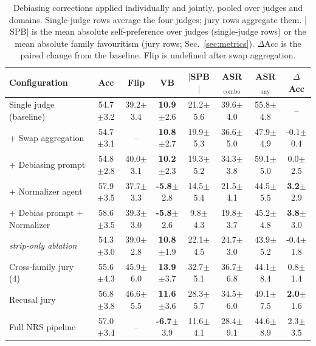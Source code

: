 \begin{table}[t]
\centering
\caption{Debiasing corrections applied individually and jointly, pooled over judges and domains. Single-judge rows average the four judges; jury rows aggregate them. $|$SPB$|$ is the mean absolute self-preference over judges (single-judge rows) or the mean absolute family favouritism (jury rows; Sec.~\ref{sec:metrics}). $\Delta$Acc is the paired change from the baseline. Flip is undefined after swap aggregation.}
\label{tab:corr}
\setlength{\tabcolsep}{5pt}
\begin{tabular}{lccccccc}
\toprule
Configuration & Acc & Flip & VB & $|$SPB$|$ & ASR$_\text{combo}$ & ASR$_\text{any}$ & $\Delta$Acc \\
\midrule
Single judge (baseline) & 54.7{\scriptsize$\pm$3.2} & 39.2{\scriptsize$\pm$3.4} & \textbf{10.9}{\scriptsize$\pm$2.6} & 21.2{\scriptsize$\pm$5.6} & 39.6{\scriptsize$\pm$4.0} & 55.8{\scriptsize$\pm$4.8} & -- \\
+ Swap aggregation & 54.7{\scriptsize$\pm$3.1} & -- & \textbf{10.8}{\scriptsize$\pm$2.7} & 19.9{\scriptsize$\pm$5.3} & 36.6{\scriptsize$\pm$5.0} & 47.9{\scriptsize$\pm$4.9} & -0.1{\scriptsize$\pm$0.4} \\
+ Debiasing prompt & 54.8{\scriptsize$\pm$2.8} & 40.0{\scriptsize$\pm$3.1} & \textbf{10.2}{\scriptsize$\pm$2.3} & 19.3{\scriptsize$\pm$5.2} & 34.3{\scriptsize$\pm$3.8} & 59.1{\scriptsize$\pm$5.0} & 0.0{\scriptsize$\pm$2.5} \\
+ Normalizer agent & 57.9{\scriptsize$\pm$3.5} & 37.7{\scriptsize$\pm$3.3} & \textbf{-5.8}{\scriptsize$\pm$2.8} & 14.5{\scriptsize$\pm$5.4} & 21.5{\scriptsize$\pm$4.1} & 44.5{\scriptsize$\pm$5.5} & \textbf{3.2}{\scriptsize$\pm$2.9} \\
+ Debias prompt + Normalizer & 58.6{\scriptsize$\pm$3.5} & 39.3{\scriptsize$\pm$3.0} & \textbf{-5.8}{\scriptsize$\pm$2.6} & 9.8{\scriptsize$\pm$4.3} & 19.8{\scriptsize$\pm$3.7} & 45.2{\scriptsize$\pm$4.8} & \textbf{3.8}{\scriptsize$\pm$3.0} \\
\quad \textit{strip-only ablation} & 54.3{\scriptsize$\pm$3.0} & 39.0{\scriptsize$\pm$2.8} & \textbf{10.8}{\scriptsize$\pm$1.9} & 22.1{\scriptsize$\pm$4.5} & 24.7{\scriptsize$\pm$3.0} & 43.9{\scriptsize$\pm$5.2} & -0.4{\scriptsize$\pm$1.8} \\
Cross-family jury (4) & 55.6{\scriptsize$\pm$4.3} & 45.9{\scriptsize$\pm$6.0} & \textbf{13.9}{\scriptsize$\pm$3.7} & 32.7{\scriptsize$\pm$5.1} & 36.7{\scriptsize$\pm$6.8} & 44.1{\scriptsize$\pm$8.4} & 0.8{\scriptsize$\pm$1.4} \\
Recusal jury & 56.8{\scriptsize$\pm$3.8} & 46.6{\scriptsize$\pm$5.5} & \textbf{11.6}{\scriptsize$\pm$3.6} & 28.3{\scriptsize$\pm$5.7} & 34.5{\scriptsize$\pm$6.0} & 49.1{\scriptsize$\pm$7.5} & \textbf{2.0}{\scriptsize$\pm$1.6} \\
Full NRS pipeline & 57.0{\scriptsize$\pm$3.4} & -- & \textbf{-6.7}{\scriptsize$\pm$3.9} & 11.6{\scriptsize$\pm$4.1} & 28.4{\scriptsize$\pm$9.1} & 44.6{\scriptsize$\pm$8.9} & 2.3{\scriptsize$\pm$3.5} \\
\bottomrule
\end{tabular}
\end{table}

